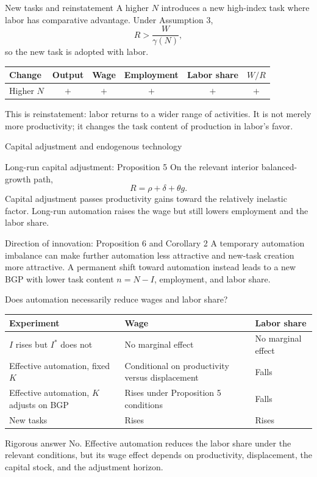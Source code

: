 \documentclass[aspectratio=169,10pt]{beamer}
\newcommand{\Istar}{I^{*}}
\begin{document}
\begin{frame}{New tasks and reinstatement}
A higher $N$ introduces a new high-index task where labor has comparative
advantage. Under Assumption 3,
\[
  R>\frac{W}{\gamma(N)},
\]
so the new task is adopted with labor.
\begin{center}
\begin{tabular}{lccccc}
\toprule
Change & Output & Wage & Employment & Labor share & $W/R$\\
\midrule
Higher $N$ & $+$ & $+$ & $+$ & $+$ & $+$\\
\bottomrule
\end{tabular}
\end{center}
This is \alert{reinstatement}: labor returns to a wider range of activities. It
is not merely more productivity; it changes the task content of production in
labor's favor.
\end{frame}

\begin{frame}{Capital adjustment and endogenous technology}
\begin{block}{Long-run capital adjustment: Proposition 5}
On the relevant interior balanced-growth path,
\[
  R=\rho+\delta+\theta g.
\]
Capital adjustment passes productivity gains toward the relatively inelastic
factor. Long-run automation raises the wage but still lowers employment and the
labor share.
\end{block}
\begin{block}{Direction of innovation: Proposition 6 and Corollary 2}
A temporary automation imbalance can make further automation less attractive
and new-task creation more attractive. A permanent shift toward automation
instead leads to a new BGP with lower task content $n=N-I$, employment, and
labor share.
\end{block}
\end{frame}

\begin{frame}{Does automation necessarily reduce wages and labor share?}
\small
\begin{center}
\begin{tabular}{p{}p{}p{}}
\toprule
Experiment & Wage & Labor share\\
\midrule
$I$ rises but $\Istar$ does not & No marginal effect & No marginal effect\\
Effective automation, fixed $K$ & Conditional on productivity versus displacement
& Falls\\
Effective automation, $K$ adjusts on BGP & Rises under Proposition 5 conditions
& Falls\\
New tasks & Rises & Rises\\
\bottomrule
\end{tabular}
\end{center}
\begin{alertblock}{Rigorous answer}
No. Effective automation reduces the labor share under the relevant conditions,
but its wage effect depends on productivity, displacement, the capital stock,
and the adjustment horizon.
\end{alertblock}
\end{frame}
\end{document}
